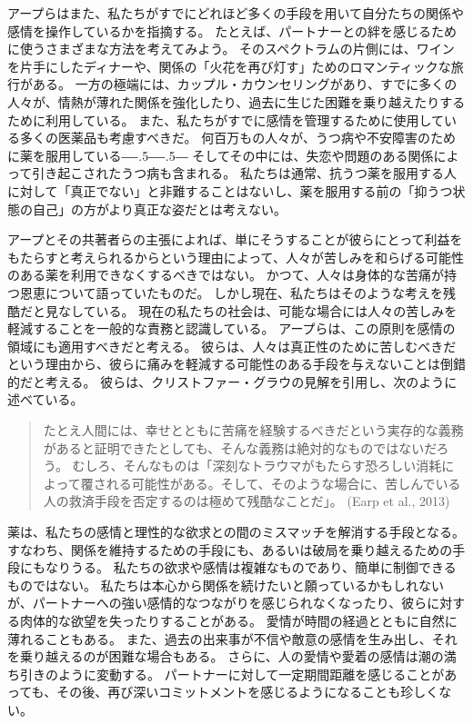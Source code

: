 \documentclass[paper=a4,book,openany]{jlreq}
\newcommand{\ig}[1]{}           %
\def\DDASH{―\kern-.5\zw―\kern-.5\zw―} %
\begin{document}
アープらはまた、私たちがすでにどれほど多くの手段を用いて自分たちの関係や感情を操作しているかを指摘する。
たとえば、パートナーとの絆を感じるために使うさまざまな方法を考えてみよう。
そのスペクトラムの片側には、ワインを片手にしたディナーや、関係の「火花を再び灯す」ためのロマンティックな旅行がある。
一方の極端には、カップル・カウンセリングがあり、すでに多くの人々が、情熱が薄れた関係を強化したり、過去に生じた困難を乗り越えたりするために利用している。
また、私たちがすでに感情を管理するために使用している多くの医薬品も考慮すべきだ。
何百万もの人々が、うつ病や不安障害のために薬を服用している{\DDASH}
そしてその中には、失恋や問題のある関係によって引き起こされたうつ病も含まれる。
私たちは通常、抗うつ薬を服用する人に対して「真正でない」と非難することはないし、薬を服用する前の「抑うつ状態の自己」の方がより真正な姿だとは考えない。

アープとその共著者らの主張によれば、単にそうすることが彼らにとって利益をもたらすと考えられるからという理由によって、人々が苦しみを和らげる可能性のある薬を利用できなくするべきではない。
かつて、人々は身体的な苦痛が持つ恩恵について語っていたものだ。
しかし現在、私たちはそのような考えを残酷だと見なしている。
現在の私たちの社会は、可能な場合には人々の苦しみを軽減することを一般的な責務と認識している。
アープらは、この原則を感情の領域にも適用すべきだと考える。
彼らは、人々は真正性のために苦しむべきだという理由から、彼らに痛みを軽減する可能性のある手段を与えないことは倒錯的だと考える。
彼らは、クリストファー・グラウ\ig{(Christopher Grau)}の見解\citep{grau06:_etern_sunsh_spotl_mind_moral_memor}を引用し、次のように述べている。

\begin{quote}
たとえ人間には、幸せとともに苦痛を経験するべきだという実存的な義務があると証明できたとしても、そんな義務は絶対的なものではないだろう。
むしろ、そんなものは「深刻なトラウマがもたらす恐ろしい消耗によって覆される可能性がある。そして、そのような場合に、苦しんでいる人の救済手段を否定するのは極めて残酷なことだ」。
(Earp et al., 2013\ig{, p.13. \citet{grau06:_etern_sunsh_spotl_mind_moral_memor}を引用している})
  \nocite{earp13:_if_i_could_just_stop_lovin_you}

\end{quote}

薬は、私たちの感情と理性的な欲求との間のミスマッチを解消する手段となる。すなわち、関係を維持するための手段にも、あるいは破局を乗り越えるための手段にもなりうる。
私たちの欲求や感情は複雑なものであり、簡単に制御できるものではない。
私たちは本心から関係を続けたいと願っているかもしれないが、パートナーへの強い感情的なつながりを感じられなくなったり、彼らに対する肉体的な欲望を失ったりすることがある。
愛情が時間の経過とともに自然に薄れることもある。
また、過去の出来事が不信や敵意の感情を生み出し、それを乗り越えるのが困難な場合もある。
さらに、人の愛情や愛着の感情は潮の満ち引きのように変動する。
パートナーに対して一定期間距離を感じることがあっても、その後、再び深いコミットメントを感じるようになることも珍しくない。
\end{document}
